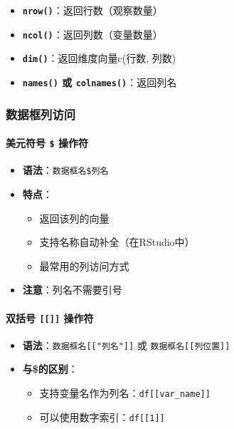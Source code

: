 \documentclass[
  twoside]{book}
\providecommand{\tightlist}{%
  \setlength{\itemsep}{0pt}\setlength{\parskip}{0pt}}
\begin{document}
\begin{itemize}
\tightlist
\item
  \textbf{\texttt{nrow()}}：返回行数（观察数量）
\item
  \textbf{\texttt{ncol()}}：返回列数（变量数量）
\item
  \textbf{\texttt{dim()}}：返回维度向量c(行数, 列数)
\item
  \textbf{\texttt{names()} 或 \texttt{colnames()}}：返回列名
\end{itemize}

\hypertarget{ux6570ux636eux6846ux5217ux8bbfux95ee}{%
\subsubsection{数据框列访问}\label{ux6570ux636eux6846ux5217ux8bbfux95ee}}

\hypertarget{ux7f8eux5143ux7b26ux53f7-ux64cdux4f5cux7b26}{%
\paragraph{\texorpdfstring{美元符号 \texttt{\$} 操作符}{美元符号 \$ 操作符}}\label{ux7f8eux5143ux7b26ux53f7-ux64cdux4f5cux7b26}}

\begin{itemize}
\tightlist
\item
  \textbf{语法}：\texttt{数据框名\$列名}
\item
  \textbf{特点}：

  \begin{itemize}
  \tightlist
  \item
    返回该列的向量
  \item
    支持名称自动补全（在RStudio中）
  \item
    最常用的列访问方式
  \end{itemize}
\item
  \textbf{注意}：列名不需要引号
\end{itemize}

\hypertarget{ux53ccux62ecux53f7-ux64cdux4f5cux7b26}{%
\paragraph{\texorpdfstring{双括号 \texttt{{[}{[}{]}{]}} 操作符}{双括号 {[}{[}{]}{]} 操作符}}\label{ux53ccux62ecux53f7-ux64cdux4f5cux7b26}}

\begin{itemize}
\tightlist
\item
  \textbf{语法}：\texttt{数据框名{[}{[}"列名"{]}{]}} 或 \texttt{数据框名{[}{[}列位置{]}{]}}
\item
  \textbf{与\$的区别}：

  \begin{itemize}
  \tightlist
  \item
    支持变量名作为列名：\texttt{df{[}{[}var\_name{]}{]}}
  \item
    可以使用数字索引：\texttt{df{[}{[}1{]}{]}}
  \end{itemize}
\end{itemize}
\end{document}
